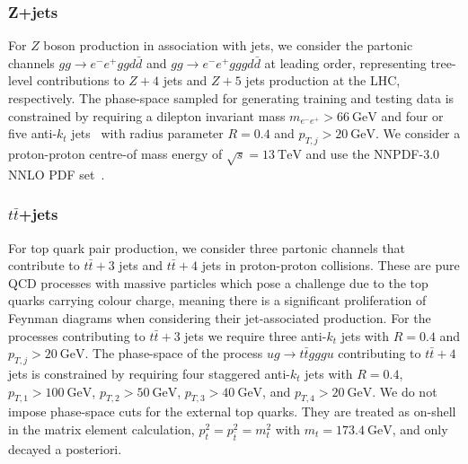 \documentclass[main.tex]{subfiles}
\begin{document}
\subsubsection*{Z+jets}
For $Z$ boson production in association with jets,
we consider the partonic channels $g g \to e^- e^+ g g d \bar{d}$
and $g g \to e^- e^+ g g g d \bar{d}$ at leading order, representing
tree-level contributions to $Z+4$ jets and $Z+5$ jets production
at the LHC, respectively. The phase-space sampled for generating training
and testing data is constrained by requiring a dilepton invariant
mass $m_{e^- e^+} > \SI{66}{\giga\electronvolt}$ and four or
five anti-$k_t$ jets~\cite{Cacciari:2008gp} with radius parameter
$R = 0.4$ and $p_{T,j} > \SI{20}{\giga\electronvolt}$.
We consider a proton-proton centre-of mass energy of
$\sqrt{s} = \SI{13}{\tera\electronvolt}$ and use the
NNPDF-3.0 NNLO PDF set~\cite{NNPDF:2014otw}.

\subsubsection*{$t\bar{t}$+jets}
For top quark pair production, we consider three partonic channels that contribute to
$t\bar{t}+3$ jets and $t\bar{t}+4$ jets in proton-proton
collisions. These are pure QCD processes with massive particles
which pose a challenge due to the top quarks carrying colour
charge, meaning there is a significant proliferation of Feynman
diagrams when considering their jet-associated production.
For the processes contributing
to $t\bar{t}+3$ jets we require three anti-$k_t$ jets
with $R=0.4$ and $p_{T,j} > \SI{20}{\giga\electronvolt}$.
The phase-space of the process $u g \to t \bar{t} g g g u$
contributing to $t\bar{t}+4$ jets is constrained by requiring
four staggered anti-$k_t$ jets with $R=0.4$, $p_{T,1} > \SI{100}{\giga\electronvolt}$,
$p_{T,2} > \SI{50}{\giga\electronvolt}$, $p_{T,3} > \SI{40}{\giga\electronvolt}$,
and $p_{T,4} > \SI{20}{\giga\electronvolt}$. We do not impose
phase-space cuts for the external top quarks. They are
treated as on-shell in the matrix element calculation,
$p_t^2 = p_{\bar{t}}^2 = m_t^2$ with $m_t = \SI{173.4}{\giga\electronvolt}$,
and only decayed a posteriori.
\end{document}
